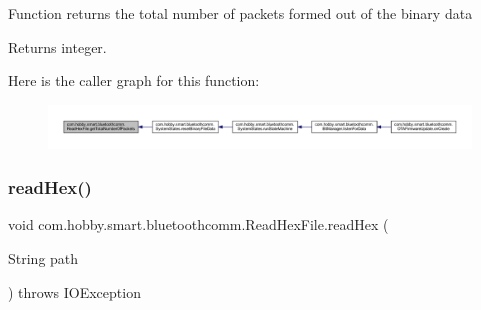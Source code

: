Function returns the total number of packets formed out of the binary data \begin{DoxyReturn}{Returns}
integer. 
\end{DoxyReturn}
Here is the caller graph for this function\+:\nopagebreak
\begin{figure}[H]
\begin{center}
\leavevmode
\includegraphics[width=350pt]{classcom_1_1hobby_1_1smart_1_1bluetoothcomm_1_1_read_hex_file_ae7deceebe800d4531c74ec4b6af7ae95_icgraph}
\end{center}
\end{figure}
\mbox{\label{classcom_1_1hobby_1_1smart_1_1bluetoothcomm_1_1_read_hex_file_ac2a312201c1ad96d3c8493c438558774}} 
\subsubsection{\texorpdfstring{read\+Hex()}{readHex()}}
{\footnotesize\ttfamily void com.\+hobby.\+smart.\+bluetoothcomm.\+Read\+Hex\+File.\+read\+Hex (\begin{DoxyParamCaption}\item[{String}]{path }\end{DoxyParamCaption}) throws I\+O\+Exception}

